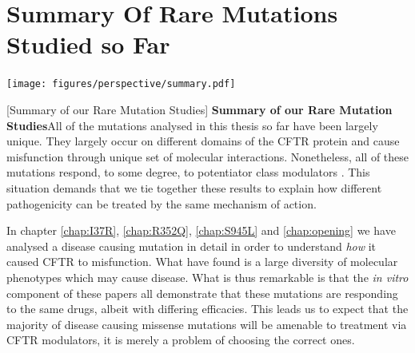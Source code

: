 

\section{Summary Of Rare Mutations Studied so Far}

	\begin{center}
		\texttt{[image: figures/perspective/summary.pdf]}
	\end{center}
\begingroup
\captionsetup{singlelinecheck = false, justification=raggedright}
[Summary of our Rare Mutation Studies] {\textbf{Summary of our Rare Mutation Studies}}{All of the mutations analysed in this thesis so far have been largely unique. They largely occur on different domains of the CFTR protein and cause misfunction through unique set of molecular interactions. Nonetheless, all of these mutations respond, to some degree, to potentiator class modulators \cite{wong2022, wong2022a, kim2018, vanwilligen2019}. This situation demands that we tie together these results to explain how different pathogenicity can be treated by the same mechanism of action. } 
\endgroup

In chapter \ref{chap:I37R}, \ref{chap:R352Q}, \ref{chap:S945L} and \ref{chap:opening} we have analysed a disease causing mutation in detail in order to understand \textit{how} it caused CFTR to misfunction. What have found is a large diversity of molecular phenotypes which may cause disease. What is thus remarkable is that the \textit{in vitro} component of these papers all demonstrate that these mutations are responding to the same drugs, albeit with differing efficacies. This leads us to expect that the majority of disease causing missense mutations will be amenable to treatment via CFTR modulators, it is merely a problem of choosing the correct ones.


